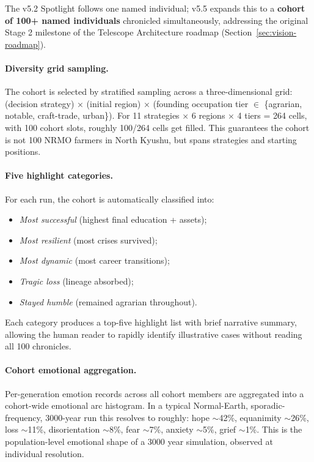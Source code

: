 The v5.2 Spotlight follows one named individual; v5.5 expands this
to a \textbf{cohort of 100+ named individuals} chronicled
simultaneously, addressing the original Stage 2 milestone of the
Telescope Architecture roadmap (Section~\ref{sec:vision-roadmap}).

\paragraph{Diversity grid sampling.}
The cohort is selected by stratified sampling across a
three-dimensional grid: (decision strategy) ×
(initial region) × (founding occupation tier $\in$ \{agrarian,
notable, craft-trade, urban\}). For 11 strategies × 6 regions × 4
tiers = 264 cells, with 100 cohort slots, roughly 100/264 cells get
filled. This guarantees the cohort is not 100 NRMO farmers in
North Kyushu, but spans strategies and starting positions.

\paragraph{Five highlight categories.}
For each run, the cohort is automatically classified into:
\begin{itemize}
\item \emph{Most successful} (highest final education + assets);
\item \emph{Most resilient} (most crises survived);
\item \emph{Most dynamic} (most career transitions);
\item \emph{Tragic loss} (lineage absorbed);
\item \emph{Stayed humble} (remained agrarian throughout).
\end{itemize}
Each category produces a top-five highlight list with brief
narrative summary, allowing the human reader to rapidly identify
illustrative cases without reading all 100 chronicles.

\paragraph{Cohort emotional aggregation.}
Per-generation emotion records across all cohort members are
aggregated into a cohort-wide emotional arc histogram. In a typical
Normal-Earth, sporadic-frequency, 3000-year run this resolves to
roughly: hope $\sim$42\%, equanimity $\sim$26\%, loss $\sim$11\%,
disorientation $\sim$8\%, fear $\sim$7\%, anxiety $\sim$5\%, grief
$\sim$1\%. This is the population-level emotional shape of a 3000
year simulation, observed at individual resolution.

